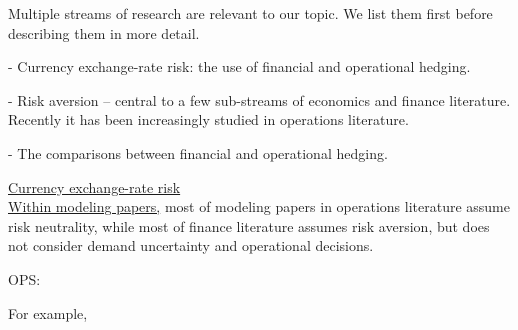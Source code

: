 \documentclass[mnsc,nonblindrev,copyedit]{informs2_wz} %
\begin{document}
\medskip

Multiple streams of research are relevant to our topic.  We list them first before describing them in more detail.

- Currency exchange-rate risk: the use of financial and operational hedging.  


- Risk aversion -- central to a few sub-streams of economics and finance literature. Recently it has been increasingly studied in operations literature. %

- The comparisons between financial and operational hedging. %

\medskip

\noindent \underline{Currency exchange-rate risk} 
\\
\noindent \underline{Within modeling papers,} most of modeling papers in operations literature assume risk neutrality, while most of finance literature assumes risk aversion, but does not consider demand uncertainty and operational decisions.

OPS: 


For example, 
\end{document}
